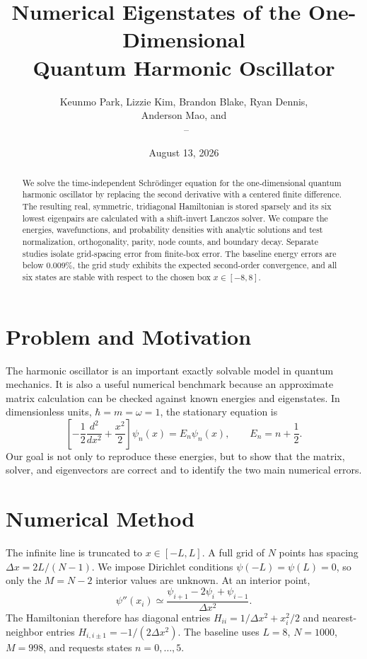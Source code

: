 \documentclass[10pt]{article}
\title{\vspace{-1.2cm}Numerical Eigenstates of the One-Dimensional\\
Quantum Harmonic Oscillator}
\author{Keunmo Park, Lizzie Kim, Brandon Blake, Ryan Dennis,\\
Anderson Mao, and \marcname\\[2pt]
\small \coursename\ -- \instructorname}
\date{August 13, 2026}
\begin{document}
\maketitle
\vspace{-0.5cm}

\begin{abstract}
We solve the time-independent Schr\"odinger equation for the
one-dimensional quantum harmonic oscillator by replacing the second
derivative with a centered finite difference. The resulting real,
symmetric, tridiagonal Hamiltonian is stored sparsely and its six lowest
eigenpairs are calculated with a shift-invert Lanczos solver. We compare
the energies, wavefunctions, and probability densities with analytic
solutions and test normalization, orthogonality, parity, node counts, and
boundary decay. Separate studies isolate grid-spacing error from
finite-box error. The baseline energy errors are below \(0.009\%\), the
grid study exhibits the expected second-order convergence, and all six
states are stable with respect to the chosen box \(x\in[-8,8]\).
\end{abstract}

\section{Problem and Motivation}
The harmonic oscillator is an important exactly solvable model in quantum
mechanics. It is also a useful numerical benchmark because an approximate
matrix calculation can be checked against known energies and eigenstates.
In dimensionless units, \(\hbar=m=\omega=1\), the stationary equation is
\begin{equation}
 \left[-\frac{1}{2}\frac{d^2}{dx^2}+\frac{x^2}{2}\right]\psi_n(x)
 =E_n\psi_n(x),
 \qquad E_n=n+\frac{1}{2}.
\end{equation}
Our goal is not only to reproduce these energies, but to show that the
matrix, solver, and eigenvectors are correct and to identify the two main
numerical errors.

\section{Numerical Method}
The infinite line is truncated to \(x\in[-L,L]\). A full grid of \(N\)
points has spacing \(\Delta x=2L/(N-1)\). We impose Dirichlet conditions
\(\psi(-L)=\psi(L)=0\), so only the \(M=N-2\) interior values are unknown.
At an interior point,
\begin{equation}
 \psi''(x_i)\simeq
 \frac{\psi_{i+1}-2\psi_i+\psi_{i-1}}{\Delta x^2}.
\end{equation}
The Hamiltonian therefore has diagonal entries
\(H_{ii}=1/\Delta x^2+x_i^2/2\) and nearest-neighbor entries
\(H_{i,i\pm1}=-1/(2\Delta x^2)\). The baseline uses \(L=8\),
\(N=1000\), \(M=998\), and requests states \(n=0,\ldots,5\).
\end{document}
